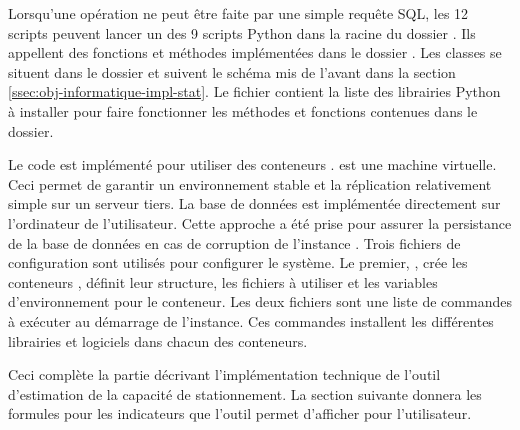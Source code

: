 Lorsqu'une opération ne peut être faite par une simple requête SQL, les 12 scripts peuvent lancer un des 9 scripts Python dans la racine du dossier \fg{}. Ils appellent des fonctions et méthodes implémentées dans le dossier \fg{}. Les classes se situent dans le dossier \fg{} et suivent le schéma mis de l'avant dans la section \ref{ssec:obj-informatique-impl-stat}. Le fichier \fg{} contient la liste des librairies Python à installer pour faire fonctionner les méthodes et fonctions contenues dans le dossier.\par

Le code est implémenté pour utiliser des conteneurs \fg{}. \fg{} est une machine virtuelle. Ceci permet de garantir un environnement stable et la réplication relativement simple sur un serveur tiers. La base de données est implémentée directement sur l'ordinateur de l'utilisateur. Cette approche a été prise pour assurer la persistance de la base de données en cas de corruption de l'instance \fg{}. Trois fichiers de configuration sont utilisés pour configurer le système. Le premier, \fg,{} crée les conteneurs \fg{}, définit leur structure, les fichiers \fg{} à utiliser et les variables d'environnement pour le conteneur. Les deux fichiers \fg{} sont une liste de commandes à exécuter au démarrage de l'instance. Ces commandes installent les différentes librairies et logiciels dans chacun des conteneurs. \par

Ceci complète la partie décrivant l'implémentation technique de l'outil d'estimation de la capacité de stationnement. La section suivante donnera les formules pour les indicateurs que l'outil permet d'afficher pour l'utilisateur. 